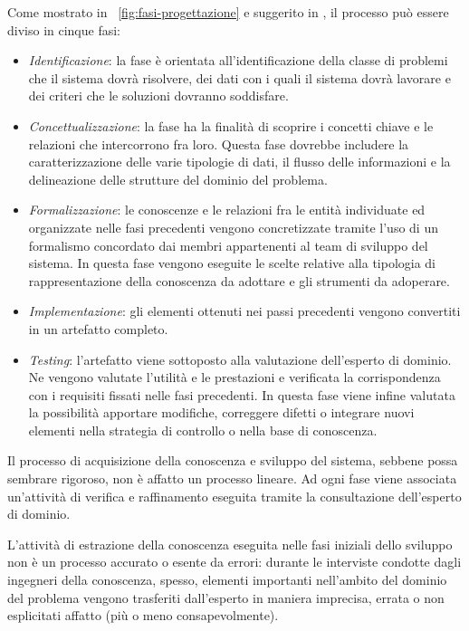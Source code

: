 Come mostrato in \figurename~\ref{fig:fasi-progettazione} e suggerito in \cite{buchanan1983}, il processo può essere diviso in cinque fasi:
\begin{itemize}
	\item \emph{Identificazione}: la fase è orientata all'identificazione della classe di problemi che il sistema dovrà risolvere, dei dati con i quali il sistema dovrà lavorare e dei criteri che le soluzioni dovranno soddisfare.
	\item \emph{Concettualizzazione}: la fase ha la finalità di scoprire i concetti chiave e le relazioni che intercorrono fra loro. Questa fase dovrebbe includere la caratterizzazione delle varie tipologie di dati, il flusso delle informazioni e la delineazione delle strutture del dominio del problema.
	\item \emph{Formalizzazione}: le conoscenze e le relazioni fra le entità individuate ed organizzate nelle fasi precedenti vengono concretizzate tramite l'uso di un formalismo concordato dai membri appartenenti al team di sviluppo del sistema. In questa fase vengono eseguite le scelte relative alla tipologia di rappresentazione della conoscenza da adottare e gli strumenti da adoperare.
	\item \emph{Implementazione}: gli elementi ottenuti nei passi precedenti vengono convertiti in un artefatto completo.
	\item \emph{Testing}: l'artefatto viene sottoposto alla valutazione dell'esperto di dominio. Ne vengono valutate l'utilità e le prestazioni e verificata la corrispondenza con i requisiti fissati nelle fasi precedenti. In questa fase viene infine valutata la possibilità apportare modifiche, correggere difetti o integrare nuovi elementi nella strategia di controllo o nella base di conoscenza.
\end{itemize}

Il processo di acquisizione della conoscenza e sviluppo del sistema, sebbene possa sembrare rigoroso, non è affatto un processo lineare. Ad ogni fase viene associata un'attività di verifica e raffinamento eseguita tramite la consultazione dell'esperto di dominio.

L'attività di estrazione della conoscenza eseguita nelle fasi iniziali dello sviluppo non è un processo accurato o esente da errori: durante le interviste condotte dagli ingegneri della conoscenza, spesso, elementi importanti nell'ambito del dominio del problema vengono trasferiti dall'esperto in maniera imprecisa, errata o non esplicitati affatto (più o meno consapevolmente). \cite{jackson1999} \cite{schank1984ia} \cite{buchanan1983}

